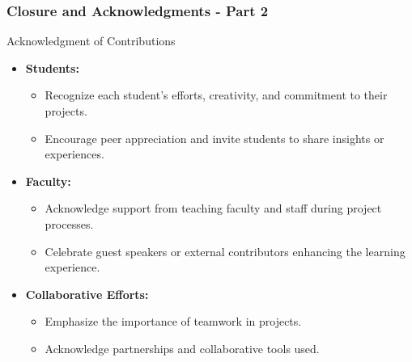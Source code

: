 \documentclass[aspectratio=169]{beamer}
\begin{document}
\begin{frame}[fragile]
    \frametitle{Closure and Acknowledgments - Part 2}
    \begin{block}{Acknowledgment of Contributions}
        \begin{itemize}
            \item \textbf{Students:}
            \begin{itemize}
                \item Recognize each student's efforts, creativity, and commitment to their projects.
                \item Encourage peer appreciation and invite students to share insights or experiences.
            \end{itemize}
            \item \textbf{Faculty:}
            \begin{itemize}
                \item Acknowledge support from teaching faculty and staff during project processes.
                \item Celebrate guest speakers or external contributors enhancing the learning experience.
            \end{itemize}
            \item \textbf{Collaborative Efforts:}
            \begin{itemize}
                \item Emphasize the importance of teamwork in projects.
                \item Acknowledge partnerships and collaborative tools used.
            \end{itemize}
        \end{itemize}
    \end{block}
\end{frame}
\end{document}
